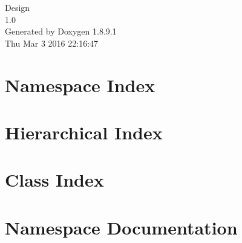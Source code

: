\documentclass[twoside]{book}
\newcommand{\+}{\discretionary{\mbox{\scriptsize$\hookleftarrow$}}{}{}}
\newcommand{\clearemptydoublepage}{%
  \newpage{\pagestyle{empty}\cleardoublepage}%
}
\begin{document}
\hypersetup{pageanchor=false,
             bookmarks=true,
             bookmarksnumbered=true,
             pdfencoding=unicode
            }
\begin{titlepage}
\vspace*{7cm}
\begin{center}%
{\Large Design \\[1ex]\large 1.\+0 }\\
\vspace*{1cm}
{\large Generated by Doxygen 1.8.9.1}\\
\vspace*{0.5cm}
{\small Thu Mar 3 2016 22:16:47}\\
\end{center}
\end{titlepage}
\clearemptydoublepage
\tableofcontents
\clearemptydoublepage
{}
\hypersetup{pageanchor=true}

\chapter{Namespace Index}

\chapter{Hierarchical Index}

\chapter{Class Index}

%
\chapter{Namespace Documentation}









\end{document}
